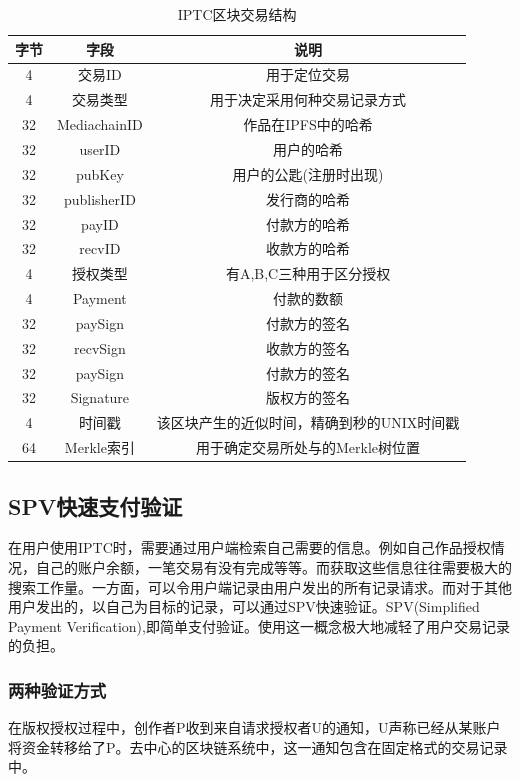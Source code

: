 \documentclass[withoutpreface,bwprint]{cumcmthesis} %
\begin{document}
\begin{table}[h]
	\caption{IPTC区块交易结构}\label{tab001} \centering
	\begin{tabular}{ccc}
		\toprule[1.5pt]
		字节 & 字段 & 说明 \\
		\midrule[1pt]
		4 & 交易ID & 用于定位交易\\
		4 & 交易类型 & 用于决定采用何种交易记录方式\\
		32 & MediachainID & 作品在IPFS中的哈希\\
		32 & userID & 用户的哈希\\
		32 & pubKey & 用户的公匙(注册时出现)\\
		32 & publisherID & 发行商的哈希\\
		32 & payID & 付款方的哈希\\
		32 & recvID & 收款方的哈希\\
		4 & 授权类型 & 有A,B,C三种用于区分授权\\
		4 & Payment & 付款的数额\\ 
		32 & paySign & 付款方的签名\\
		32 & recvSign & 收款方的签名\\
		32 & paySign & 付款方的签名\\
		32 & Signature & 版权方的签名\\
		4 & 时间戳 & 该区块产生的近似时间，精确到秒的UNIX时间戳\\
		64 & Merkle索引 & 用于确定交易所处与的Merkle树位置\\
		\bottomrule[1.5pt]
	\end{tabular}
\end{table}

\subsection{SPV快速支付验证}
在用户使用IPTC时，需要通过用户端检索自己需要的信息。例如自己作品授权情况，自己的账户余额，一笔交易有没有完成等等。而获取这些信息往往需要极大的搜索工作量。一方面，可以令用户端记录由用户发出的所有记录请求。而对于其他用户发出的，以自己为目标的记录，可以通过SPV快速验证。SPV(Simplified Payment Verification),即简单支付验证。使用这一概念极大地减轻了用户交易记录的负担。

\subsubsection{两种验证方式}

在版权授权过程中，创作者P收到来自请求授权者U的通知，U声称已经从某账户将资金转移给了P。去中心的区块链系统中，这一通知包含在固定格式的交易记录中。
\end{document}
